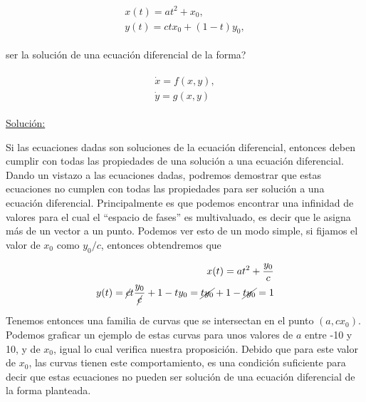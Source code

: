 \documentclass[a4paper,10pt]{article}
\begin{document}
\begin{gather*}
 \begin{split}
 x(t) = at^2 + x_0, \\
 y(t) = ctx_0 + (1-t)y_0,
 \end{split}
\end{gather*}

ser la solución de una ecuación diferencial de la forma?

\begin{gather*}
 \begin{split}
 \dot{x} = f(x,y), \\
 \dot{y} = g(x,y)
 \end{split}
\end{gather*}

\vspace{.3cm}

\underline{Solución:}

Si las ecuaciones dadas son soluciones de la ecuación diferencial, entonces deben
cumplir con todas las propiedades de una solución a una ecuación diferencial. Dando
un vistazo a las ecuaciones dadas, podremos demostrar que estas ecuaciones no cumplen
con todas las propiedades para ser solución a una ecuación diferencial. Principalmente
es que podemos encontrar una infinidad de valores para el cual el ``espacio de fases'' es 
multivaluado, es decir que le asigna más de un vector a un punto. Podemos ver esto de un 
modo simple, si fijamos el valor de $x_0$ como $y_0/c$, entonces obtendremos que

\begin{align}
 \begin{split}
  x(t) =  at^2 + \frac{y_0}{c} \\
  y(t) = \cancel{c} t \frac{y_0}{\cancel{c}} + 1 - t y_0 = 
  \cancel{t y_0} + 1 -\cancel{t y_0} = 1
  \label{eq:ec1prob2}
 \end{split}
\end{align}

Tenemos entonces una familia de curvas que se intersectan en el punto $(a,cx_0)$. Podemos
graficar un ejemplo de estas curvas para unos valores de $a$ entre -10 y 10, y de $x_0$, igual
lo cual verifica nuestra proposición. Debido que para este valor de $x_0$, las curvas tienen
este comportamiento, es una condición suficiente para decir que estas ecuaciones no pueden
ser solución de una ecuación diferencial de la forma planteada.
\end{document}
